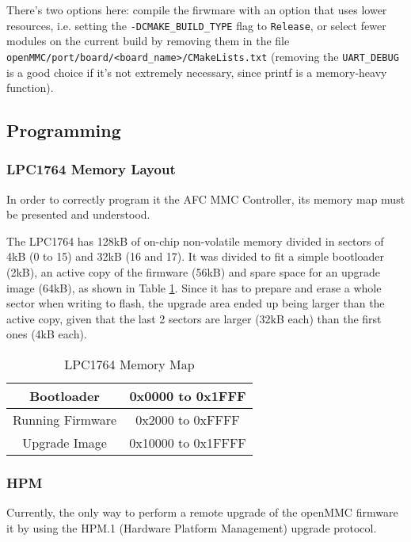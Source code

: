 \documentclass[letterpaper,12pt, titlepage]{article}
\begin{document}
There's two options here: compile the firwmare with an option that uses lower resources, i.e. setting the \texttt{-DCMAKE\_BUILD\_TYPE} flag to \texttt{Release}, or select fewer modules on the current build by removing them in the file \texttt{openMMC/port/board/<board\_name>/CMakeLists.txt} (removing the \texttt{UART\_DEBUG} is a good choice if it's not extremely necessary, since printf is a memory-heavy function).

\subsection{Programming}

\subsubsection{LPC1764 Memory Layout}
In order to correctly program it the AFC MMC Controller, its memory map must be presented and understood.

The LPC1764 has 128kB of on-chip non-volatile memory divided in sectors of 4kB (0 to 15) and 32kB (16 and 17). It was divided to fit a simple bootloader (2kB), an active copy of the firmware (56kB) and spare space for an upgrade image (64kB), as shown in Table \ref{tbl:lpc-memory-map}. Since it has to prepare and erase a whole sector when writing to flash, the upgrade area ended up being larger than the active copy, given that the last 2 sectors are larger (32kB each) than the first ones (4kB each).

\begin{table}[ht]
  \begin{center}
    \caption{LPC1764 Memory Map}
    \label{tbl:lpc-memory-map}
    \begin{tabular}{|c|c|}
      \hline
      Bootloader & 0x0000 to 0x1FFF\\
      \hline
      Running Firmware & 0x2000 to 0xFFFF\\
      \hline
      Upgrade Image & 0x10000 to 0x1FFFF\\
      \hline
    \end{tabular}
  \end{center}
\end{table}

\subsubsection{HPM}
Currently, the only way to perform a remote upgrade of the openMMC firmware it by using the HPM.1 (Hardware Platform Management) upgrade protocol.
\end{document}
